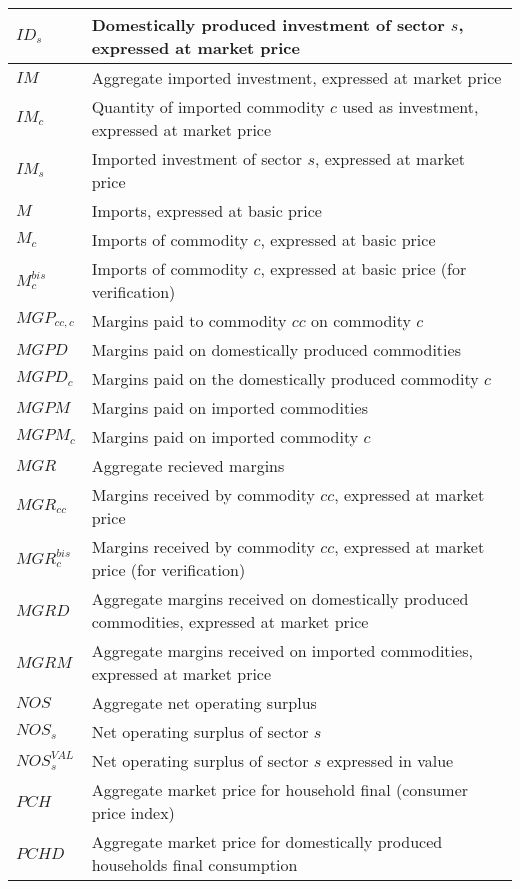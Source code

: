 \documentclass[12pt]{article}
\numberwithin{equation}{section}
\begin{document}
\begin{longtable}{@{}p{4cm}p{9cm}@{}}
 \midrule 
$ID_{s}$ & Domestically produced investment of sector $s$, expressed at market price \\
 \midrule 
$IM$ & Aggregate imported investment, expressed at market price \\
 \midrule 
$IM_{c}$ & Quantity of imported commodity $c$ used as investment, expressed at market price \\
 \midrule 
$IM_{s}$ & Imported investment of sector $s$, expressed at market price \\
 \midrule 
$M$ & Imports, expressed at basic price \\
 \midrule 
$M_{c}$ & Imports of commodity $c$, expressed at basic price \\
 \midrule 
$M^{bis}_{c}$ & Imports of commodity $c$, expressed at basic price (for verification) \\
 \midrule 
$MGP_{cc, c}$ & Margins paid to commodity $cc$ on commodity $c$ \\
 \midrule 
$MGPD$ & Margins paid on domestically produced commodities \\
 \midrule 
$MGPD_{c}$ & Margins paid on the domestically produced commodity $c$ \\
 \midrule 
$MGPM$ & Margins paid on imported commodities \\
 \midrule 
$MGPM_{c}$ & Margins paid on imported commodity $c$ \\
 \midrule 
$MGR$ & Aggregate recieved margins \\
 \midrule 
$MGR_{cc}$ & Margins received by commodity $cc$, expressed at market price \\
 \midrule 
$MGR^{bis}_{c}$ & Margins received by commodity $cc$, expressed at market price (for verification) \\
 \midrule 
$MGRD$ & Aggregate margins received on domestically produced commodities, expressed at market price \\
 \midrule 
$MGRM$ & Aggregate margins received on imported commodities, expressed at market price \\
 \midrule 
$NOS$ & Aggregate net operating surplus \\
 \midrule 
$NOS_{s}$ & Net operating surplus of sector $s$ \\
 \midrule 
$NOS^{VAL}_{s}$ & Net operating surplus of sector $s$ expressed in value \\
 \midrule 
$PCH$ & Aggregate market price for household final (consumer price index) \\
 \midrule 
$PCHD$ & Aggregate market price for domestically produced households final consumption \\

\end{longtable}
\end{document}
